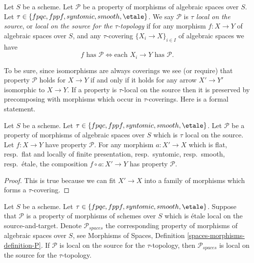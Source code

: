 \begin{definition}
\label{definition-property-morphisms-local-source}
Let $S$ be a scheme.
Let $\mathcal{P}$ be a property of morphisms of algebraic spaces over $S$.
Let $\tau \in \{fpqc, \linebreak[0] fppf, \linebreak[0] syntomic, \linebreak[0]
smooth, \linebreak[0] \etale\}$. We say $\mathcal{P}$ is
{\it $\tau$ local on the source}, or
{\it local on the source for the $\tau$-topology} if for
any morphism $f : X \to Y$ of algebraic spaces over $S$, and any
$\tau$-covering $\{X_i \to X\}_{i \in I}$ of algebraic spaces we have
$$
f \text{ has }\mathcal{P}
\Leftrightarrow
\text{each }X_i \to Y\text{ has }\mathcal{P}.
$$
\end{definition}

\noindent
To be sure, since isomorphisms are always coverings
we see (or require) that property $\mathcal{P}$ holds for $X \to Y$
if and only if it holds for any arrow $X' \to Y'$ isomorphic to $X \to Y$.
If a property is $\tau$-local on the source then it is preserved by
precomposing with morphisms which occur in $\tau$-coverings. Here
is a formal statement.

\begin{lemma}
\label{lemma-precompose-property-local-source}
Let $S$ be a scheme.
Let $\tau \in \{fpqc, \linebreak[0] fppf, \linebreak[0] syntomic, \linebreak[0]
smooth, \linebreak[0] \etale\}$.
Let $\mathcal{P}$ be a property of morphisms of algebraic spaces over $S$
which is $\tau$ local on the source. Let $f : X \to Y$ have property
$\mathcal{P}$. For any morphism $a : X' \to X$ which is
flat, resp.\ flat and locally of finite presentation, resp.\ syntomic,
resp.\ smooth, resp.\ \'etale, the composition $f \circ a : X' \to Y$ has
property $\mathcal{P}$.
\end{lemma}

\begin{proof}
This is true because we can fit $X' \to X$ into a family of
morphisms which forms a $\tau$-covering.
\end{proof}

\begin{lemma}
\label{lemma-transfer-from-schemes}
Let $S$ be a scheme.
Let $\tau \in \{fpqc, \linebreak[0] fppf, \linebreak[0] syntomic, \linebreak[0]
smooth, \linebreak[0] \etale\}$.
Suppose that $\mathcal{P}$ is a property of morphisms of schemes over $S$
which is \'etale local on the source-and-target. Denote $\mathcal{P}_{spaces}$
the corresponding property of morphisms of algebraic spaces over $S$, see
Morphisms of Spaces, Definition \ref{spaces-morphisms-definition-P}.
If $\mathcal{P}$ is local on the source for the $\tau$-topology, then
$\mathcal{P}_{spaces}$ is local on the source for the $\tau$-topology.
\end{lemma}

